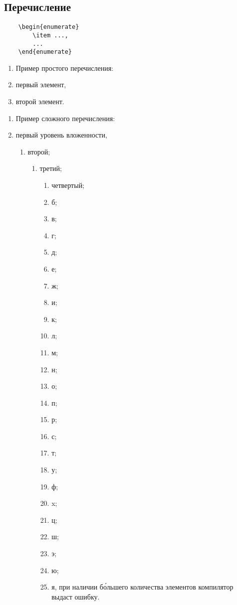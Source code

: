 \documentclass[14pt, a4paper, titlepage]{extarticle}
\begin{document}
\subsection{Перечисление}

\begin{verbatim}
	\begin{enumerate}
		\item ...,
		...
	\end{enumerate} 
\end{verbatim}

\begin{enumerate}
	\item[] Пример простого перечисления:
	\item первый элемент,
	\item второй элемент.
\end{enumerate}

\begin{enumerate}
	\item[] Пример сложного перечисления:
	\item первый уровень вложенности,
	\begin{enumerate}
		\item второй;
		\begin{enumerate}
			\item третий;
			\begin{enumerate}
				\item четвертый;
				\item б;
				\item в;
				\item г;
				\item д;
				\item е;
				\item ж;
				\item и;
				\item к;
				\item л;
				\item м;
				\item н;
				\item о;
				\item п;
				\item р;
				\item с;
				\item т;
				\item у;
				\item ф;
				\item x;
				\item ц;
				\item ш;
				\item э;
				\item ю;
				\item я, при наличии б\'ольшего количества элементов компилятор выдаст ошибку.
			\end{enumerate}
		\end{enumerate}
	\end{enumerate}
\end{enumerate}
\end{document}
